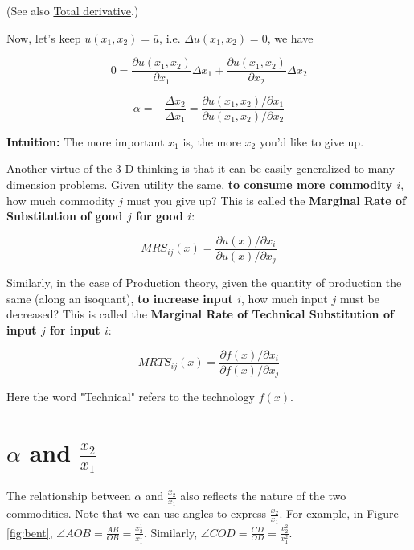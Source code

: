 \documentclass{article}
\begin{document}
\begin{mdframed}[backgroundcolor=blue!20,linecolor=white]
(See also \href{https://en.wikipedia.org/wiki/Total_derivative}{Total derivative}.)

Now, let's keep $u(x_1,x_2) = \bar{u}$, i.e. $\Delta u(x_1,x_2) = 0$, we have

$$0 = \frac{\partial u(x_1,x_2)}{\partial x_1} \Delta x_1 + \frac{\partial u(x_1,x_2)}{\partial x_2} \Delta x_2$$


$$ \alpha = - \frac{\Delta x_2}{\Delta x_1} = \frac{\partial u(x_1,x_2) / \partial x_1}{\partial u(x_1,x_2) / \partial x_2}$$

\textbf{Intuition:} The more important $x_1$ is, the more $x_2$ you'd like to give up.

\vspace{2mm}


Another virtue of the 3-D thinking is that it can be easily generalized to many-dimension problems. Given utility the same, \textbf{to consume more commodity $i$}, how much commodity $j$ must you give up? This is called the \textbf{Marginal Rate of Substitution of good $j$ for good $i$}:

$$MRS_{ij}(x) = \frac{\partial u(x) / \partial x_i}{\partial u(x) / \partial x_j}$$

Similarly, in the case of Production theory, given the quantity of production the same (along an isoquant), \textbf{to increase input $i$}, how much input $j$ must be decreased? This is called the \textbf{Marginal Rate of Technical Substitution of input $j$ for input $i$}:

$$MRTS_{ij}(x) = \frac{\partial f(x) / \partial x_i}{\partial f(x) / \partial x_j}$$

Here the word "Technical" refers to the technology $f(x)$.

\section{$\alpha$ and $\frac{x_2}{x_1}$}


The relationship between $\alpha$ and $\frac{x_2}{x_1}$ also reflects the nature of the two commodities. Note that we can use angles to express $\frac{x_2}{x_1}$. For example, in Figure \ref{fig:bent}, $\angle AOB = \frac{AB}{OB} = \frac{x^1_2}{x^1_1}$. Similarly,  $\angle COD = \frac{CD}{OD} = \frac{x^2_2}{x^2_1}$.

\begin{center}
\end{center}
\end{mdframed}
\end{document}
